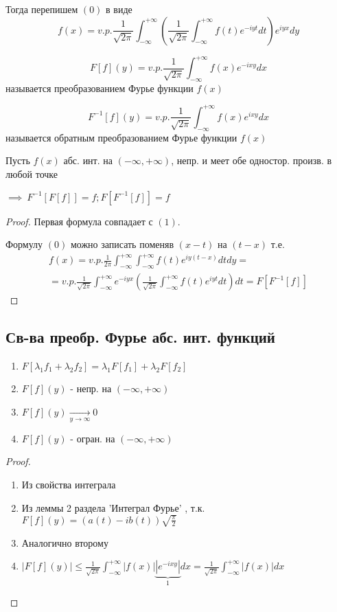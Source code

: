 \documentclass{article}
\begin{document}
Тогда перепишем $(0)$ в виде
\[
  f(x)=v.p. \frac{1}{\sqrt{2\pi}}\int_{-\infty}^{+\infty}\left(\frac{1}{\sqrt{2\pi}}\int_{-\infty}^{+\infty}f(t)e^{-iyt}dt\right)e^{iyx}dy \tag{1}
\]
\begin{definition}
  \[
    F[f](y)=v.p. \frac{1}{\sqrt{2\pi}}\int_{-\infty}^{+\infty}f(x)e^{-ixy}dx
  \]
  называется преобразованием Фурье функции $f(x)$
\end{definition}
\begin{definition}
  \[
    F^{-1}[f](y)=v.p. \frac{1}{\sqrt{2\pi}}\int_{-\infty}^{+\infty}f(x)e^{ixy}dx
  \]
  называется обратным преобразованием Фурье функции $f(x)$
\end{definition}
\begin{theorem}[Т1]
  Пусть $f(x)$ абс. инт. на $(-\infty,+\infty)$, непр. и меет обе одностор. произв. в любой точке

  $\implies \ F^{-1}[F[f]]=f; F[F^{-1}[f]]=f$
\end{theorem}
\begin{proof}
  Первая формула совпадает с $(1)$.

  Формулу $(0)$ можно записать поменяв $(x-t)$ на $(t-x)$ т.е.
  \begin{gather*}
    f(x) = v.p. \frac{1}{2\pi}\int_{-\infty}^{+\infty}\int_{-\infty}^{+\infty}f(t)e^{iy(t-x)}dtdy = \\ 
    = v.p. \frac{1}{\sqrt{2\pi}}\int_{-\infty}^{+\infty}e^{-iyx}\left(\frac{1}{\sqrt{2\pi}}\int_{-\infty}^{+\infty}f(t)e^{iyt}dt\right)dt = F[F^{-1}[f]]
  \end{gather*}
\end{proof}
\subsection{Св-ва преобр. Фурье абс. инт. функций}
\begin{enumerate}
  \item $F[\lambda_1 f_1+\lambda_2f_2]=\lambda_1F[f_1]+\lambda_2F[f_2]$
  \item $F[f](y)$ - непр. на $(-\infty,+\infty)$
  \item $F[f](y) \underset{y\to \infty}{\to}0$
  \item $F[f](y)$ - огран. на $(-\infty,+\infty)$
\end{enumerate}
\begin{proof}
  \phantom{.}

  \begin{enumerate}
    \item Из свойства интеграла
    \item Из леммы 2 раздела 'Интеграл Фурье'
      , т.к. $F[f](y)=(a(t)-ib(t))\sqrt{\frac{\pi}{2}}$
    \item Аналогично второму
    \item $|F[f](y)|\le \frac{1}{\sqrt{2\pi}}\int_{-\infty}^{+\infty}|f(x)|\underbrace{|e^{-ixy}|}_{1}dx=\frac{1}{\sqrt{2\pi}}\int_{-\infty}^{+\infty}|f(x)|dx$
  \end{enumerate}
\end{proof}
\end{document}
